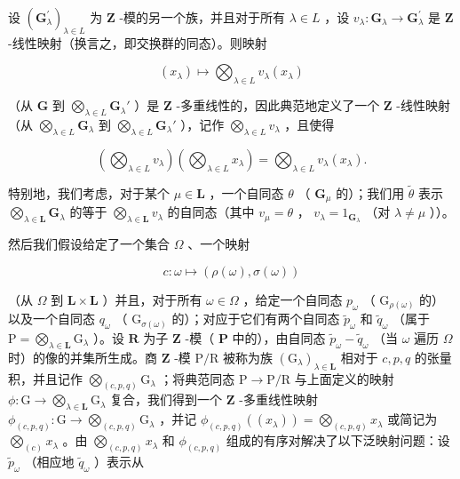 设 \((\mathbf{G}_{\lambda}^{\prime})_{\lambda \in L}\) 为 \(\mathbf{Z}\) -模的另一个族，并且对于所有 \(\lambda \in L\) ，设 \(v_{\lambda}: \mathbf{G}_{\lambda} \to \mathbf{G}_{\lambda}^{\prime}\) 是 \(\mathbf{Z}\) -线性映射（换言之，即交换群的同态）。则映射

\[
(x _ {\lambda}) \mapsto \bigotimes_ {\lambda \in L} v _ {\lambda} (x _ {\lambda})
\]

（从 \(\mathbf{G}\) 到 \(\bigotimes_{\lambda \in L} \mathbf{G}_{\lambda}'\) ）是 \(\mathbf{Z}\) -多重线性的，因此典范地定义了一个 \(\mathbf{Z}\) -线性映射（从 \(\bigotimes_{\lambda \in L} \mathbf{G}_{\lambda}\) 到 \(\bigotimes_{\lambda \in L} \mathbf{G}_{\lambda}'\) ），记作 \(\bigotimes_{\lambda \in L} v_{\lambda}\) ，且使得

\[
\left(\bigotimes_ {\lambda \in L} v _ {\lambda}\right) \left(\bigotimes_ {\lambda \in L} x _ {\lambda}\right) = \bigotimes_ {\lambda \in L} v _ {\lambda} (x _ {\lambda}).\tag{25}
\]

特别地，我们考虑，对于某个 \(\mu \in \mathbf{L}\) ，一个自同态 \(\theta\) （ \(\mathbf{G}_{\mu}\) 的）；我们用 \(\tilde{\theta}\) 表示 \(\bigotimes_{\lambda \in \mathbf{L}} \mathbf{G}_{\lambda}\) 的等于 \(\bigotimes_{\lambda \in \mathbf{L}} v_{\lambda}\) 的自同态（其中 \(v_{\mu} = \theta\) ， \(v_{\lambda} = 1_{\mathbf{G}_{\lambda}}\) （对 \(\lambda \neq \mu\) ））。

然后我们假设给定了一个集合 \(\Omega\) 、一个映射

\[
c: \omega \mapsto (\rho (\omega), \sigma (\omega))
\]

（从 \(\Omega\) 到 \(\mathbf{L} \times \mathbf{L}\) ）并且，对于所有 \(\omega \in \Omega\) ，给定一个自同态 \(p_{\omega}\) （ \(\mathrm{G}_{\rho(\omega)}\) 的）以及一个自同态 \(q_{\omega}\) （ \(\mathrm{G}_{\sigma(\omega)}\) 的）；对应于它们有两个自同态 \(\tilde{p}_{\omega}\) 和 \(\tilde{q}_{\omega}\) （属于 \(\mathrm{P} = \bigotimes_{\lambda \in \mathbf{L}} \mathrm{G}_{\lambda}\) ）。设 \(\mathbf{R}\) 为子 \(\mathbf{Z}\) -模（ \(\mathbf{P}\) 中的），由自同态 \(\tilde{p}_{\omega} - \tilde{q}_{\omega}\) （当 \(\omega\) 遍历 \(\Omega\) 时）的像的并集所生成。商 \(\mathbf{Z}\) -模 \(\mathrm{P/R}\) 被称为族 \((\mathrm{G}_{\lambda})_{\lambda \in \mathbf{L}}\) 相对于 \(c, p, q\) 的张量积，并且记作 \(\bigotimes_{(c, p, q)} \mathrm{G}_{\lambda}\) ；将典范同态 \(\mathrm{P} \to \mathrm{P/R}\) 与上面定义的映射 \(\phi: \mathrm{G} \to \bigotimes_{\lambda \in \mathbf{L}} \mathrm{G}_{\lambda}\) 复合，我们得到一个 \(\mathbf{Z}\) -多重线性映射 \(\phi_{(c, p, q)}: \mathrm{G} \to \bigotimes_{(c, p, q)} \mathrm{G}_{\lambda}\) ，并记 \(\phi_{(c, p, q)}((x_{\lambda})) = \bigotimes_{(c, p, q)} x_{\lambda}\) 或简记为 \(\bigotimes_{(c)} x_{\lambda}\) 。由 \(\bigotimes_{(c, p, q)} x_{\lambda}\) 和 \(\phi_{(c, p, q)}\) 组成的有序对解决了以下泛映射问题：设 \(\tilde{p}_{\omega}\) （相应地 \(\tilde{q}_{\omega}\) ）表示从

